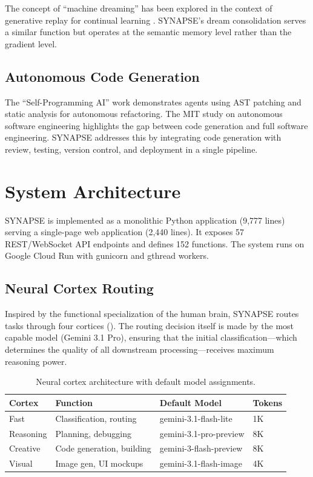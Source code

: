\documentclass[11pt,a4paper]{article}
\begin{document}
The concept of ``machine dreaming'' has been explored in the context of generative replay for continual learning \cite{shin2017continual}. SYNAPSE's dream consolidation serves a similar function but operates at the semantic memory level rather than the gradient level.

\subsection{Autonomous Code Generation}

The ``Self-Programming AI'' work \cite{selfprogramming2025} demonstrates agents using AST patching and static analysis for autonomous refactoring. The MIT study on autonomous software engineering \cite{mit2025challenges} highlights the gap between code generation and full software engineering. SYNAPSE addresses this by integrating code generation with review, testing, version control, and deployment in a single pipeline.

\section{System Architecture}
\label{sec:architecture}

SYNAPSE is implemented as a monolithic Python application (9,777 lines) serving a single-page web application (2,440 lines). It exposes 57 REST/WebSocket API endpoints and defines 152 functions. The system runs on Google Cloud Run with gunicorn and gthread workers.

\subsection{Neural Cortex Routing}

Inspired by the functional specialization of the human brain, SYNAPSE routes tasks through four cortices (). The routing decision itself is made by the most capable model (Gemini 3.1 Pro), ensuring that the initial classification---which determines the quality of all downstream processing---receives maximum reasoning power.

\begin{table}[H]
\centering
\caption{Neural cortex architecture with default model assignments.}
\label{tab:cortices}
\begin{tabular}{@{}llll@{}}
\toprule
\textbf{Cortex} & \textbf{Function} & \textbf{Default Model} & \textbf{Tokens} \\
\midrule
Fast      & Classification, routing    & gemini-3.1-flash-lite  & 1K \\
Reasoning & Planning, debugging        & gemini-3.1-pro-preview & 8K \\
Creative  & Code generation, building  & gemini-3-flash-preview & 8K \\
Visual    & Image gen, UI mockups      & gemini-3.1-flash-image & 4K \\
\bottomrule
\end{tabular}
\end{table}
\end{document}

